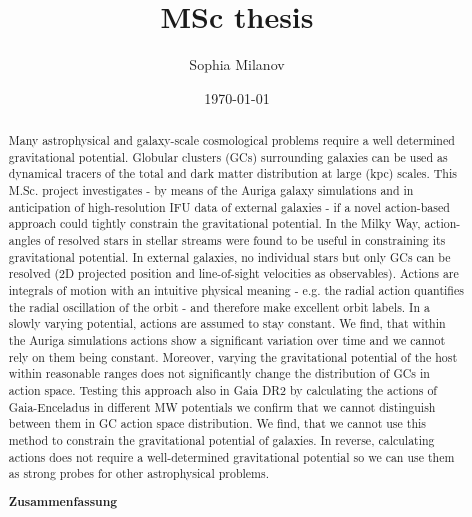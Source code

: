 \documentclass[a4paper,12pt,abstracton]{scrartcl}
\title{MSc thesis}
\author{Sophia Milanov}
\date{\today}
\begin{document}
 

\onehalfspacing

\titlepage
\begin{abstract}
\hspace{-12pt}Many astrophysical and galaxy-scale cosmological problems require a well determined gravitational potential. Globular clusters (GCs) surrounding galaxies can be used as dynamical tracers of the total and dark matter distribution at large (kpc) scales. This M.Sc. project investigates - by means of the Auriga galaxy simulations and in anticipation of high-resolution IFU data of external galaxies - if a novel action-based approach could tightly constrain the gravitational potential. In the Milky Way, action-angles of resolved stars in stellar streams were found to be useful in constraining its gravitational potential. In external galaxies, no individual stars but only GCs can be resolved (2D projected position and line-of-sight velocities as observables). Actions are integrals of motion with an intuitive physical meaning - e.g. the radial action quantifies the radial oscillation of the orbit - and therefore make excellent orbit labels. In a slowly varying potential, actions are assumed to stay constant. We find, that within the Auriga simulations actions show a significant variation over time and we cannot rely on them being constant. Moreover, varying the gravitational potential of the host within reasonable ranges does not significantly change the distribution of GCs in action space. Testing this approach also in Gaia DR2 by calculating the actions of Gaia-Enceladus in different MW potentials we confirm that we cannot distinguish between them in GC action space distribution. We find, that we cannot use this method to constrain the gravitational potential of galaxies. In reverse, calculating actions does not require a well-determined gravitational potential so we can use them as strong probes for other astrophysical problems. 

\begin{center}
 \textbf{Zusammenfassung}\end{center}

\hspace{-12pt}\blindtext

\end{abstract}

\newpage
{}
\tableofcontents

\newpage
{}
\end{document}
